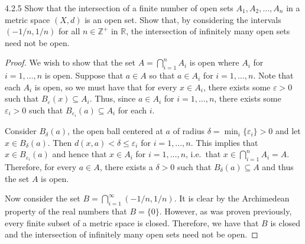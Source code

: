 \begin{problem}{4.2.5}
  Show that the intersection of a finite number of open sets $A_1, A_2, \dots, A_n$
  in a metric space $(X, d)$ is an open set. Show that, by considering the intervals
  $(-1/n, 1/n)$ for all $n \in \mathbb{Z}^+$ in $\mathbb{R}$, the intersection of infinitely
  many open sets need not be open.
\end{problem}

\begin{proof}
  We wish to show that the set $A = \bigcap_{i=1}^n A_i$ is open where $A_i$ for $i=1,\dots, n$ is open.
  Suppose that $a \in A$ so that $a \in A_i$ for $i=1,\dots, n$.
  Note that each $A_i$ is open, so we must have that for every $x \in A_i$, there exists some
  $\varepsilon > 0$ such that $B_\varepsilon(x) \subseteq A_i$. Thus, since $a\in A_i$ for $i=1,\dots, n$,
  there exists some $\varepsilon_i > 0$ such that $B_{\varepsilon_i}(a) \subseteq A_i$ for each $i$.

  Consider $B_\delta(a)$, the open ball centered at $a$ of radius $\delta = \min_i\{\varepsilon_i\} > 0$ and
  let $x \in B_\delta(a)$. Then $d(x, a) < \delta \leq \varepsilon_i$ for $i = 1, \dots, n$.
  This implies that $x \in B_{\varepsilon_i}(a)$ and hence that $x \in A_i$ for $i = 1, \dots, n$, i.e.\
  that $x \in \bigcap_{i=1}^n A_i = A$.
  Therefore, for every $a \in A$, there exists a $\delta > 0$ such that $B_\delta(a) \subseteq A$
  and thus the set $A$ is open.

  Now consider the set $B = \bigcap_{i=1}^\infty (-1/n, 1/n)$. It is clear by the Archimedean property of the real numbers
  that $B = \{0\}$. However, as was proven previously, every finite subset of a metric space is closed. Therefore, we
  have that $B$ is closed and the intersection of infinitely many open sets need not be open.

\end{proof}
\newpage
